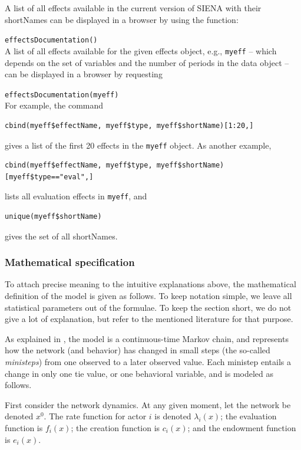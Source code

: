 \documentclass[a4paper,fleqn,11pt]{article}
\newcommand{\+}{\, + \,}
\newcommand{\sfn}[1]{\textsf{#1}}
\newcommand{\SI}{{\sf SIENA }}
\begin{document}
A list of all effects available in the current version of
\SI with their \sfn{shortName}s can be displayed in a browser
by using the function:

\verb|effectsDocumentation()| \\

A list of all effects available for the given effects object, e.g.,
\texttt{myeff} -- which depends on the set of variables and the number of periods
in the data object --  can be displayed in a browser
by requesting

\verb|effectsDocumentation(myeff)| \\

For example, the command
\begin{verbatim}
cbind(myeff$effectName, myeff$type, myeff$shortName)[1:20,]
\end{verbatim}
gives a list of the first 20 effects in the \texttt{myeff} object.
As another example,
\begin{verbatim}
cbind(myeff$effectName, myeff$type, myeff$shortName)[myeff$type=="eval",]
\end{verbatim}
lists all evaluation effects in \texttt{myeff},
and
\begin{verbatim}
unique(myeff$shortName)
\end{verbatim}
gives the set of all \sfn{shortName}s.

\subsubsection{Mathematical specification}
\label{S_mathmod}

To attach precise meaning to the intuitive explanations above,
the mathematical definition of the model is given as follows.
To keep notation simple, we leave all statistical parameters out of the
formulae. To keep the section short, we do not give a lot of explanation,
but refer to the mentioned literature for that purpose.

As explained in \citet*{SnijdersEA10b}, the model is a continuous-time
Markov chain, and represents how the network (and behavior) has changed
in small steps (the so-called \emph{ministeps}) from one observed
to a later observed value. Each ministep entails a change in only
one tie value, or one behavioral variable, and is modeled as follows.

First consider the network dynamics.
At any given moment, let the network be denoted $x^0$.
The rate function for actor $i$ is denoted $\lambda_i(x)$;
the evaluation function is $f_i(x)$; the creation function is $c_i(x)$;
and the endowment function is $e_i(x)$.
\end{document}
